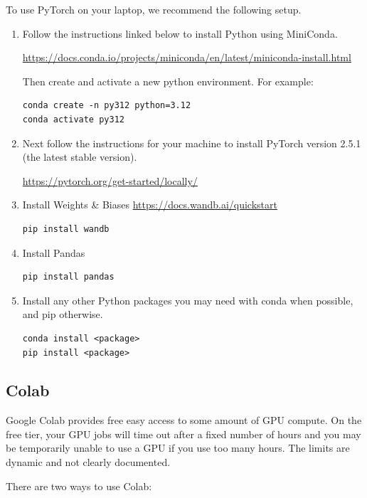 \documentclass[11pt,addpoints,answers]{exam}
\begin{document}
To use PyTorch on your laptop, we recommend the following setup.

\begin{enumerate}
\item Follow the instructions linked below to install Python using MiniConda.  

\url{https://docs.conda.io/projects/miniconda/en/latest/miniconda-install.html}

Then create and activate a new python environment. For example:
\begin{lstlisting}
conda create -n py312 python=3.12
conda activate py312
\end{lstlisting}

\item Next follow the instructions for your machine to install PyTorch version 2.5.1 (the latest stable version). 

\url{https://pytorch.org/get-started/locally/}

\item Install Weights \& Biases \url{https://docs.wandb.ai/quickstart}
\begin{lstlisting}
pip install wandb
\end{lstlisting}

\item Install Pandas
\begin{lstlisting}
pip install pandas
\end{lstlisting}

\item Install any other Python packages you may need with conda when possible, and pip otherwise.
\begin{lstlisting}
conda install <package>
pip install <package>
\end{lstlisting}
\end{enumerate}

\subsection*{Colab}
\label{sec:colab}

Google Colab provides free easy access to some amount of GPU compute. On the free tier, your GPU jobs will time out after a fixed number of hours and you may be temporarily unable to use a GPU if you use too many hours. The limits are dynamic and not clearly documented.

There are two ways to use Colab: 
\end{document}
